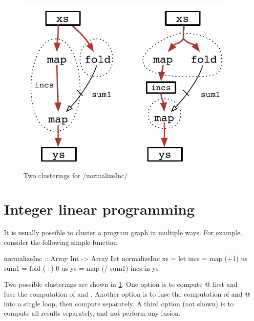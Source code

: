 
\begin{figure}
\begin{center}
\includegraphics[scale=0.5]{copy/03-body/clustering/figures/ex2-normalizeInc.pdf}
\end{center}
\caption{Two clusterings for \Hs/normalizeInc/}
\label{clustering:f:normalizeInc}
\end{figure}


\section{Integer linear programming}
\label{clustering:s:ILP}
It is usually possible to cluster a program graph in multiple ways.
For example, consider the following simple function:
\begin{haskell}
normalizeInc :: Array Int -> Array Int
normalizeInc xs
 = let incs = map  (+1)     us
       sum1 = fold (+) 0    us
       ys   = map  (/ sum1) incs
   in  ys
\end{haskell}

Two possible clusterings are shown in \cref{clustering:f:normalizeInc}.
One option is to compute @ first and fuse the computation of \Hs@incs@ and \Hs@ys@.
Another option is to fuse the computation of \Hs@incs@ and @ into a single loop, then compute \Hs@ys@ separately.
A third option (not shown) is to compute all results separately, and not perform any fusion. 

